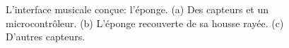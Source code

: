 \documentclass[11pt]{article}
\begin{document}
\begin{figure}
  \centering
  \caption{L'interface musicale conçue: l'éponge.  (a) Des capteurs et un microcontrôleur.  (b) L'éponge recouverte de sa housse rayée.  (c) D'autres capteurs.}
  \label{fig:eponge}
\end{figure}
\end{document}
